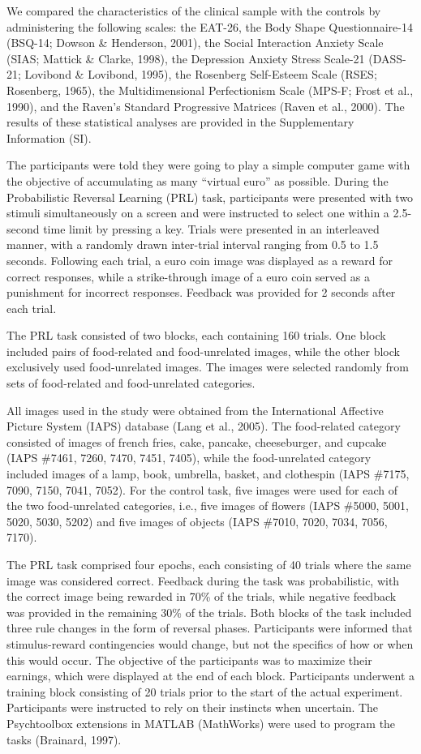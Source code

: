 \documentclass[
  man,floatsintext]{apa6}
\begin{document}
We compared the characteristics of the clinical sample with the controls by administering the following scales: the EAT-26, the Body Shape Questionnaire-14 (BSQ-14; Dowson \& Henderson, 2001), the Social Interaction Anxiety Scale (SIAS; Mattick \& Clarke, 1998), the Depression Anxiety Stress Scale-21 (DASS-21; Lovibond \& Lovibond, 1995), the Rosenberg Self-Esteem Scale (RSES; Rosenberg, 1965), the Multidimensional Perfectionism Scale (MPS-F; Frost et al., 1990), and the Raven's Standard Progressive Matrices (Raven et al., 2000). The results of these statistical analyses are provided in the Supplementary Information (SI).

The participants were told they were going to play a simple computer game with the objective of accumulating as many ``virtual euro'' as possible. During the Probabilistic Reversal Learning (PRL) task, participants were presented with two stimuli simultaneously on a screen and were instructed to select one within a 2.5-second time limit by pressing a key. Trials were presented in an interleaved manner, with a randomly drawn inter-trial interval ranging from 0.5 to 1.5 seconds. Following each trial, a euro coin image was displayed as a reward for correct responses, while a strike-through image of a euro coin served as a punishment for incorrect responses. Feedback was provided for 2 seconds after each trial.

The PRL task consisted of two blocks, each containing 160 trials. One block included pairs of food-related and food-unrelated images, while the other block exclusively used food-unrelated images. The images were selected randomly from sets of food-related and food-unrelated categories.

All images used in the study were obtained from the International Affective Picture System (IAPS) database (Lang et al., 2005). The food-related category consisted of images of french fries, cake, pancake, cheeseburger, and cupcake (IAPS \#7461, 7260, 7470, 7451, 7405), while the food-unrelated category included images of a lamp, book, umbrella, basket, and clothespin (IAPS \#7175, 7090, 7150, 7041, 7052). For the control task, five images were used for each of the two food-unrelated categories, i.e., five images of flowers (IAPS \#5000, 5001, 5020, 5030, 5202) and five images of objects (IAPS \#7010, 7020, 7034, 7056, 7170).

The PRL task comprised four epochs, each consisting of 40 trials where the same image was considered correct. Feedback during the task was probabilistic, with the correct image being rewarded in 70\% of the trials, while negative feedback was provided in the remaining 30\% of the trials. Both blocks of the task included three rule changes in the form of reversal phases. Participants were informed that stimulus-reward contingencies would change, but not the specifics of how or when this would occur. The objective of the participants was to maximize their earnings, which were displayed at the end of each block. Participants underwent a training block consisting of 20 trials prior to the start of the actual experiment. Participants were instructed to rely on their instincts when uncertain. The Psychtoolbox extensions in MATLAB (MathWorks) were used to program the tasks (Brainard, 1997).
\end{document}
